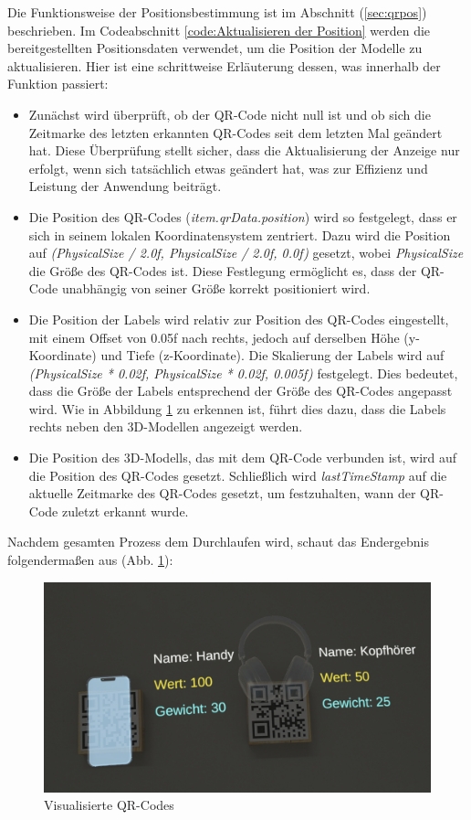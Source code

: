 Die Funktionsweise der Positionsbestimmung ist im Abschnitt (\ref{sec:qrpos}) beschrieben. Im Codeabschnitt \ref{code:Aktualisieren der Position} werden die bereitgestellten Positionsdaten verwendet, um die Position der Modelle zu aktualisieren. Hier ist eine schrittweise Erläuterung dessen, was innerhalb der Funktion passiert:
\begin{itemize}
    \item Zunächst wird überprüft, ob der QR-Code nicht null ist und ob sich die Zeitmarke des letzten erkannten QR-Codes seit dem letzten Mal geändert hat. Diese Überprüfung stellt sicher, dass die Aktualisierung der Anzeige nur erfolgt, wenn sich tatsächlich etwas geändert hat, was zur Effizienz und Leistung der Anwendung beiträgt.
    \item Die Position des QR-Codes (\textit{item.qrData.position}) wird so festgelegt, dass er sich in seinem lokalen Koordinatensystem zentriert. Dazu wird die Position auf \textit{(PhysicalSize / 2.0f, PhysicalSize / 2.0f, 0.0f)} gesetzt, wobei \textit{PhysicalSize} die Größe des QR-Codes ist. Diese Festlegung ermöglicht es, dass der QR-Code unabhängig von seiner Größe korrekt positioniert wird.
    \item Die Position der Labels wird relativ zur Position des QR-Codes eingestellt, mit einem Offset von 0.05f nach rechts, jedoch auf derselben Höhe (y-Koordinate) und Tiefe (z-Koordinate). Die Skalierung der Labels wird auf \textit{(PhysicalSize * 0.02f, PhysicalSize * 0.02f, 0.005f)} festgelegt. Dies bedeutet, dass die Größe der Labels entsprechend der Größe des QR-Codes angepasst wird. Wie in Abbildung \ref{fig:visqr} zu erkennen ist, führt dies dazu, dass die Labels rechts neben den 3D-Modellen angezeigt werden.
    \item Die Position des 3D-Modells, das mit dem QR-Code verbunden ist, wird auf die Position des QR-Codes gesetzt. Schließlich wird \textit{lastTimeStamp} auf die aktuelle Zeitmarke des QR-Codes gesetzt, um festzuhalten, wann der QR-Code zuletzt erkannt wurde.
\end{itemize}

Nachdem gesamten Prozess dem Durchlaufen wird, schaut das Endergebnis folgendermaßen aus (Abb. \ref{fig:visqr}):

\begin{figure}[H]
    \centering
    \includegraphics[scale=0.15, angle=0]{images/scanned}
    \caption{Visualisierte QR-Codes}
    \label{fig:visqr}
\end{figure}

